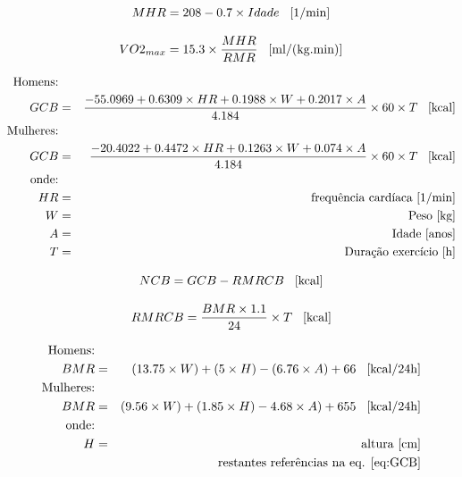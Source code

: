 \documentclass[a4paper,10pt]{report}
\begin{document}
\begin{equation} \label{eq:MHR} 
MHR = 208 - 0.7 \times Idade \text{\hspace*{0.3cm}[1/min]}
\end{equation}

\begin{equation} \label{eq:VO2max} 
VO2_{max} = 15.3 \times \frac{MHR}{RMR} \text{\hspace*{0.3cm}[ml/(kg.min)]}
\end{equation}

\begin{eqnarray} \label{eq:GCB}
\text{Homens:}&&\\ 
GCB &=& \frac{-55.0969 + 0.6309 \times HR + 0.1988 \times W + 0.2017 \times A}{4.184} \times 60 \times T \text{\hspace*{0.3cm}[kcal]}\nonumber\\
\text{Mulheres:}&&\nonumber\\ 
GCB &=& \frac{-20.4022 + 0.4472 \times HR + 0.1263 \times W + 0.074 \times A}{4.184} \times 60 \times T \text{\hspace*{0.3cm}[kcal]}\nonumber\\
\text{onde:}&& \nonumber\\
HR &=& \text{frequência cardíaca [1/min]}\nonumber\\ 
W &=& \text{Peso [kg]}\nonumber\\
A &=& \text{Idade [anos]}\nonumber\\
T &=& \text{Duração exercício [h]}\nonumber
\end{eqnarray}

\begin{equation} \label{eq:NCB} 
NCB = GCB - RMRCB \text{\hspace*{0.3cm}[kcal]}
\end{equation}

\begin{equation} \label{eq:RMRCB} 
RMRCB = \frac{BMR \times 1.1}{24} \times T \text{\hspace*{0.3cm}[kcal]}
\end{equation}

\begin{eqnarray} \label{eq:BMR}
\text{Homens:}&&\\
BMR &=& (13.75 \times W) + (5 \times H) - (6.76 \times A) + 66 \text{\hspace*{0.3cm}[kcal/24h]}\nonumber\\
\text{Mulheres:}&&\nonumber\\ 
BMR &=& (9.56 \times W) + (1.85 \times H) - 4.68 \times A) + 655 \text{\hspace*{0.3cm}[kcal/24h]}\nonumber\\
\text{onde:}&& \nonumber\\
H &=& \text{altura [cm]}\nonumber\\ 
&&\text{restantes referências na eq. \ref{eq:GCB}}\nonumber
\end{eqnarray}
\end{document}

